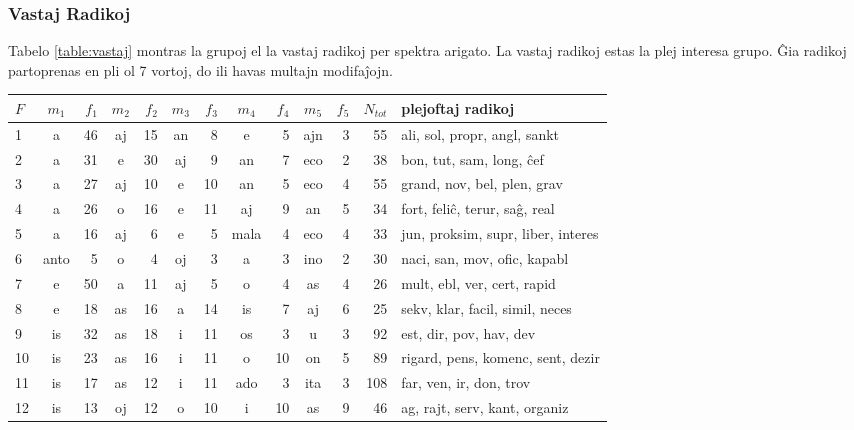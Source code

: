 \documentclass[12pt,twoside]{article}
\begin{document}
\subsubsection{Vastaj Radikoj}
Tabelo \ref{table:vastaj} montras la grupoj el la vastaj radikoj per spektra arigato. 
La vastaj radikoj estas la plej interesa grupo. Ĝia radikoj partoprenas en pli ol 7 vortoj, do ili havas
multajn modifaĵojn. 

\vspace{.2 in}
\begin{table}[h!]
\begin{center}
\begin{tabular}{ |l||c|r||c|r||c|r||c|r||c|r||r|l| }
\hline
$F$& $m_1$ & $f_1$&$m_2$ & $f_2$&$m_3$ & $f_3$& $m_4$  & $f_4$& $m_5$ & $f_5$& $N_{tot}$ &   plejoftaj radikoj     \\
\hline
1     &a   &46  &aj   &15   &an    &8     &e    &5   &ajn    &3   &55 &          ali, sol, propr, angl, sankt \\
2     &a   &31   &e   &30   &aj    &9    &an    &7   &eco    &2   &38 &              bon, tut, sam, long, ĉef \\
3     &a   &27  &aj   &10    &e   &10    &an    &5   &eco    &4   &55 &           grand, nov, bel, plen, grav \\
4     &a   &26   &o   &16    &e   &11    &aj    &9    &an    &5   &34 &         fort, feliĉ, terur, saĝ, real \\
5     &a   &16  &aj    &6    &e    &5  &mala    &4   &eco    &4   &33 &    jun, proksim, supr, liber, interes \\
6  &anto    &5   &o    &4   &oj    &3     &a    &3   &ino    &2   &30 &          naci, san, mov, ofic, kapabl \\
7     &e   &50   &a   &11   &aj    &5     &o    &4    &as    &4   &26 &           mult, ebl, ver, cert, rapid \\
8     &e   &18  &as   &16    &a   &14    &is    &7    &aj    &6   &25 &       sekv, klar, facil, simil, neces \\
9    &is   &32  &as   &18    &i   &11    &os    &3     &u    &3   &92 &               est, dir, pov, hav, dev \\
10    &is   &23  &as   &16    &i   &11     &o   &10    &on    &5   &89 &     rigard, pens, komenc, sent, dezir \\
11    &is   &17  &as   &12    &i   &11   &ado    &3   &ita    &3  &108 &               far, ven, ir, don, trov \\
12    &is   &13  &oj   &12    &o   &10     &i   &10    &as    &9   &46 &         ag, rajt, serv, kant, organiz \\

\end{tabular}
\end{center}
\end{table}
\end{document}
